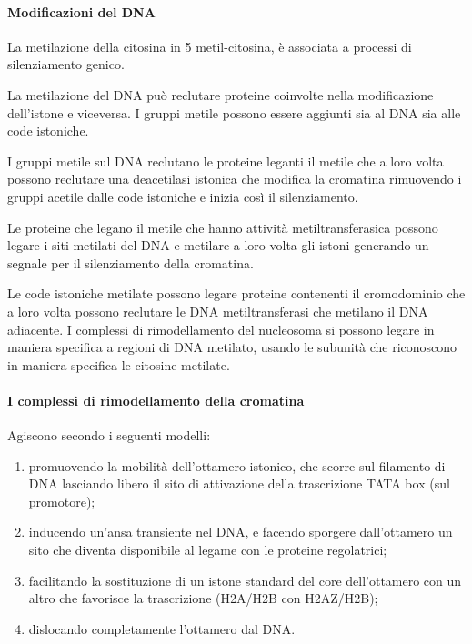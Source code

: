 \documentclass[11pt]{book}
\begin{document}
\paragraph{Modificazioni del DNA}\label{modificazioni-del-dna}

La metilazione della citosina in 5 metil-citosina, è associata a
processi di silenziamento genico.

La metilazione del DNA può reclutare proteine coinvolte nella
modificazione dell'istone e viceversa. I gruppi metile possono essere
aggiunti sia al DNA sia alle code istoniche.

I gruppi metile sul DNA reclutano le proteine leganti il metile che a
loro volta possono reclutare una deacetilasi istonica che modifica la
cromatina rimuovendo i gruppi acetile dalle code istoniche e inizia così
il silenziamento.

Le proteine che legano il metile che hanno attività metiltransferasica
possono legare i siti metilati del DNA e metilare a loro volta gli
istoni generando un segnale per il silenziamento della cromatina.

Le code istoniche metilate possono legare proteine contenenti il
cromodominio che a loro volta possono reclutare le DNA metiltransferasi
che metilano il DNA adiacente. I complessi di rimodellamento del
nucleosoma si possono legare in maniera specifica a regioni di DNA
metilato, usando le subunità che riconoscono in maniera specifica le
citosine metilate.

\paragraph{I complessi di rimodellamento della
cromatina}\label{i-complessi-di-rimodellamento-della-cromatina}

Agiscono secondo i seguenti modelli:

\begin{enumerate}
\def\labelenumi{\arabic{enumi}.}
\itemsep1pt\parskip0pt
\item
  promuovendo la mobilità dell'ottamero istonico, che scorre sul
  filamento di DNA lasciando libero il sito di attivazione della
  trascrizione TATA box (sul promotore);
\item
  inducendo un'ansa transiente nel DNA, e facendo sporgere dall'ottamero
  un sito che diventa disponibile al legame con le proteine regolatrici;
\item
  facilitando la sostituzione di un istone standard del core
  dell'ottamero con un altro che favorisce la trascrizione (H2A/H2B con
  H2AZ/H2B);
\item
  dislocando completamente l'ottamero dal DNA.
\end{enumerate}
\end{document}

